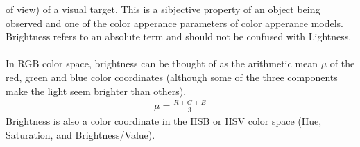 \begin{itemize}
   of view) of a visual target. This is a sibjective property of an object being observed and 
   one of the color apperance parameters of color apperance models. Brightness refers to an
   absolute term and should not be confused with Lightness.
   \\
   \\
   In RGB color space, brightness can be thought of as the arithmetic mean $\mu$ of the red, green and blue
   color coordinates (although some of the three components make the light seem brighter than others).
   \begin{align}
      \mu = \frac{R + G + B}{3}
   \end{align}
   Brightness is also a color coordinate in the HSB or HSV color space (Hue, Saturation, and Brightness/Value).
\end{itemize}

\newpage
